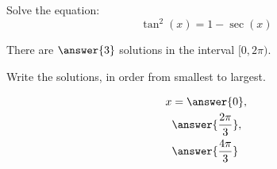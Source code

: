 \documentclass{ximera}
\author{Bobby Ramsey}
\begin{document}
\begin{exercise}

	Solve the equation:
	 \[\tan^2(x) = 1-\sec(x) \]
	
	There are $\answer{3}$ solutions in the interval $[0, 2\pi)$.	
	\begin{exercise}
		Write the solutions, in order from smallest to largest.
		
		\begin{align*}
			x & = \answer{0}, \\
			 	& \answer{\frac{2\pi}{3}}, \\
			 	& \answer{\frac{4\pi}{3}}
		\end{align*}	 	 


	\end{exercise}

\end{exercise}
\end{document}
